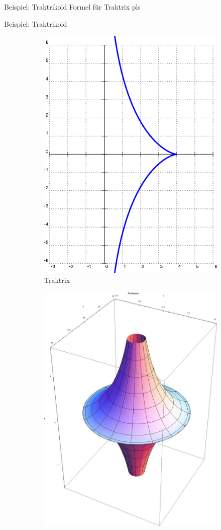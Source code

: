 \documentclass[12pt]{beamer}
\begin{document}
\begin{frame}{Beispiel: Traktrikoid}
Formel für Traktrix pls
\end{frame}

\begin{frame}{Beispiel: Traktrikoid}

\begin{figure}
\begin{subfigure}{.5\textwidth}
  \centering
  \includegraphics[width=.8\linewidth]{traktrix.png}
  \caption{Traktrix}
\end{subfigure}%
\begin{subfigure}{.5\textwidth}
  \centering
  \includegraphics[width=.8\linewidth]{pseudosphere.png}

\end{subfigure}
\end{figure}
\end{frame}
\end{document}
